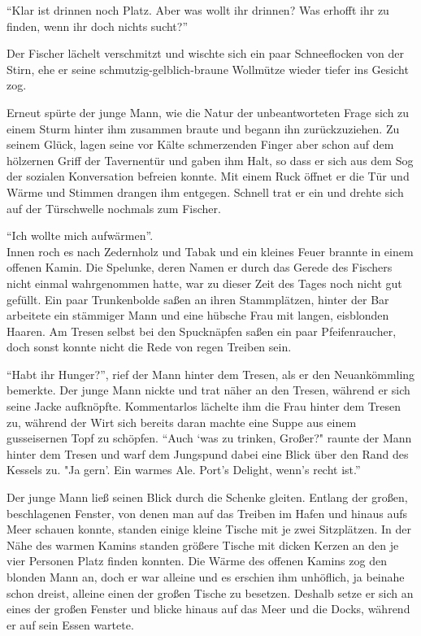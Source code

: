 ``Klar ist drinnen noch Platz. Aber was wollt ihr drinnen? Was erhofft ihr zu finden, wenn ihr doch nichts sucht?''

Der Fischer lächelt verschmitzt und wischte sich ein paar Schneeflocken von der Stirn, ehe er seine schmutzig-gelblich-braune Wollmütze wieder tiefer ins Gesicht zog.

Erneut spürte der junge Mann, wie die Natur der unbeantworteten Frage sich zu einem Sturm hinter ihm zusammen braute und begann ihn zurückzuziehen. Zu seinem Glück, lagen seine vor Kälte schmerzenden Finger aber schon auf dem hölzernen Griff der Tavernentür und gaben ihm Halt, so dass er sich aus dem Sog der sozialen Konversation befreien konnte. Mit einem Ruck öffnet er die Tür und Wärme und Stimmen drangen ihm entgegen. Schnell trat er ein und drehte sich auf der Türschwelle nochmals zum Fischer. 

``Ich wollte mich aufwärmen''.\\

Innen roch es nach Zedernholz und Tabak und ein kleines Feuer brannte in einem offenen Kamin. Die Spelunke, deren Namen er durch das Gerede des Fischers nicht einmal wahrgenommen hatte, war zu dieser Zeit des Tages noch nicht gut gefüllt. Ein paar Trunkenbolde saßen an ihren Stammplätzen, hinter der Bar arbeitete ein stämmiger Mann und eine hübsche Frau mit langen, eisblonden Haaren. Am Tresen selbst bei den Spucknäpfen saßen ein paar Pfeifenraucher, doch sonst konnte nicht die Rede von regen Treiben sein.

``Habt ihr Hunger?'', rief der Mann hinter dem Tresen, als er den Neuankömmling bemerkte. Der junge Mann nickte und trat näher an den Tresen, während er sich seine Jacke aufknöpfte. Kommentarlos lächelte ihm die Frau hinter dem Tresen zu, während der Wirt sich bereits daran machte eine Suppe aus einem gusseisernen Topf zu schöpfen. 
``Auch `was zu trinken, Großer?" raunte der Mann hinter dem Tresen und warf dem Jungspund dabei eine Blick über den Rand des Kessels zu. 
"Ja gern'. Ein warmes Ale. Port's Delight, wenn's recht ist.''

Der junge Mann ließ seinen Blick durch die Schenke gleiten. Entlang der großen, beschlagenen Fenster, von denen man auf das Treiben im Hafen und hinaus aufs Meer schauen konnte, standen einige kleine Tische mit je zwei Sitzplätzen. In der Nähe des warmen Kamins standen größere Tische mit dicken Kerzen an den je vier Personen Platz finden konnten. Die Wärme des offenen Kamins zog den blonden Mann an, doch er war alleine und es erschien ihm unhöflich, ja beinahe schon dreist, alleine einen der großen Tische zu besetzen. Deshalb setze er sich an eines der großen Fenster und blicke hinaus auf das Meer und die Docks, während er auf sein Essen wartete.

